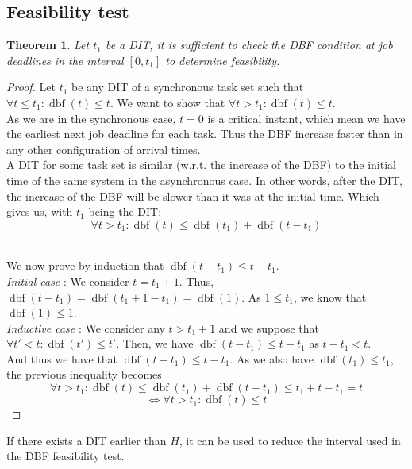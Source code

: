 \documentclass[a4paper,10pt]{article}
\newcommand{\dbf}[1]{\operatorname{dbf}(#1)}
\newtheorem{theorem}{Theorem}
\begin{document}
\subsection{Feasibility test}
\label{sct:ditsynchfeastest}

\begin{theorem}
 Let $t_1$ be a DIT, it is sufficient to check the DBF condition at job deadlines in the interval $[0, t_1]$ to determine feasibility.
\end{theorem}

\begin{proof}
Let $t_1$ be any DIT of a synchronous task set such that $\forall t \leq t_1 : \dbf{t} \leq t$. We want to show that $\forall t > t_1 : \dbf{t} \leq t$.\\

As we are in the synchronous case, $t=0$ is a critical instant, which mean we have the earliest next job deadline for each task. Thus the DBF increase faster than in any other configuration of arrival times.\\

A DIT for some task set is similar (w.r.t. the increase of the DBF) to the initial time of the same system in the asynchronous case. In other words, after the DIT, the increase of the DBF will be slower than it was at the initial time. Which gives us, with $t_1$ being the DIT:
$$\forall t > t_1 : \dbf{t} \leq \dbf{t_1} + \dbf{t-t_1}$$

~\\

We now prove by induction that $\dbf{t-t_1} \leq t - t_1$.\\

\emph{Initial case} : We consider $t = t_1 + 1$. Thus, $\dbf{t-t_1} = \dbf{t_1 + 1 - t_1} = \dbf{1}$. As $1 \leq t_1$, we know that $\dbf{1} \leq 1$.\\

\emph{Inductive case} : We consider any $t > t_1 + 1$ and we suppose that $\forall t' < t : \dbf{t'} \leq t'$. Then, we have $\dbf{t - t_1} \leq t - t_1$ as $t - t_1 < t$.\\

And thus we have that $\dbf{t-t_1} \leq t - t_1$. As we also have $\dbf{t_1} \leq t_1$, the previous inequality becomes
$$\forall t > t_1 : \dbf{t} \leq \dbf{t_1} + \dbf{t-t_1} \leq t_1 + t - t_1 = t$$
$$\iff \forall t > t_1 : \dbf{t} \leq t$$
\end{proof}

If there exists a DIT earlier than $H$, it can be used to reduce the interval used in the DBF feasibility test.
\end{document}
